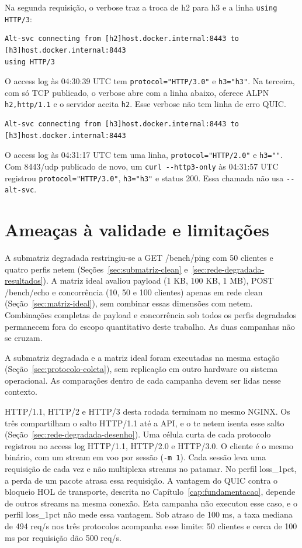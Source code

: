 Na segunda requisição, o verbose traz a troca de h2 para h3 e a linha \texttt{using HTTP/3}:

\begin{lstlisting}
Alt-svc connecting from [h2]host.docker.internal:8443 to [h3]host.docker.internal:8443
using HTTP/3
\end{lstlisting}

O access log às 04:30:39 UTC tem \texttt{protocol=\string"HTTP/3.0\string"} e \texttt{h3=\string"h3\string"}. Na terceira, com só TCP publicado, o verbose abre com a linha abaixo, oferece ALPN \texttt{h2,http/1.1} e o servidor aceita \texttt{h2}. Esse verbose não tem linha de erro QUIC.

\begin{lstlisting}
Alt-svc connecting from [h3]host.docker.internal:8443 to [h3]host.docker.internal:8443
\end{lstlisting}

O access log às 04:31:17 UTC tem uma linha, \texttt{protocol=\string"HTTP/2.0\string"} e \texttt{h3=\string"\string"}. Com 8443/udp publicado de novo, um \texttt{curl -{}-http3-only} às 04:31:57 UTC registrou \texttt{protocol=\string"HTTP/3.0\string"}, \texttt{h3=\string"h3\string"} e status 200. Essa chamada não usa \texttt{-{}-alt-svc}.

\section{Ameaças à validade e limitações}\label{sec:ameacas-validade}

A submatriz degradada restringiu-se a GET /bench/ping com 50 clientes e quatro perfis netem (Seções~\ref{sec:submatriz-clean} e~\ref{sec:rede-degradada-resultados}). A matriz ideal avaliou payload (1 KB, 100 KB, 1 MB), POST /bench/echo e concorrência (10, 50 e 100 clientes) apenas em rede clean (Seção~\ref{sec:matriz-ideal}), sem combinar essas dimensões com netem. Combinações completas de payload e concorrência sob todos os perfis degradados permanecem fora do escopo quantitativo deste trabalho. As duas campanhas não se cruzam.

A submatriz degradada e a matriz ideal foram executadas na mesma estação (Seção~\ref{sec:protocolo-coleta}), sem replicação em outro hardware ou sistema operacional. As comparações dentro de cada campanha devem ser lidas nesse contexto.

HTTP/1.1, HTTP/2 e HTTP/3 desta rodada terminam no mesmo NGINX. Os três compartilham o salto HTTP/1.1 até a API, e o tc netem isenta esse salto (Seção~\ref{sec:rede-degradada-desenho}). Uma célula curta de cada protocolo registrou no access log HTTP/1.1, HTTP/2.0 e HTTP/3.0. O cliente é o mesmo binário, com um stream em voo por sessão (\texttt{-m 1}). Cada sessão leva uma requisição de cada vez e não multiplexa streams no patamar. No perfil loss\_1pct, a perda de um pacote atrasa essa requisição. A vantagem do QUIC contra o bloqueio HOL de transporte, descrita no Capítulo~\ref{cap:fundamentacao}, depende de outros streams na mesma conexão. Esta campanha não executou esse caso, e o perfil loss\_1pct não mede essa vantagem. Sob atraso de 100 ms, a taxa mediana de 494 req/s nos três protocolos acompanha esse limite: 50 clientes e cerca de 100 ms por requisição dão 500 req/s.


